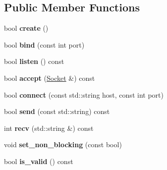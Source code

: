\subsection*{Public Member Functions}
\begin{DoxyCompactItemize}
\item 
\hypertarget{classSocket_a6afde2dca985dacdfa770141192e2daf}{bool {\bfseries create} ()}\label{classSocket_a6afde2dca985dacdfa770141192e2daf}

\item 
\hypertarget{classSocket_abfc7244009defd5c5e1ad173142a5059}{bool {\bfseries bind} (const int port)}\label{classSocket_abfc7244009defd5c5e1ad173142a5059}

\item 
\hypertarget{classSocket_a0988791cca0cc0eeee0c854500d7f527}{bool {\bfseries listen} () const }\label{classSocket_a0988791cca0cc0eeee0c854500d7f527}

\item 
\hypertarget{classSocket_a068f789510d289f59a1fc1f51fbb9ed3}{bool {\bfseries accept} (\hyperlink{classSocket}{Socket} \&) const }\label{classSocket_a068f789510d289f59a1fc1f51fbb9ed3}

\item 
\hypertarget{classSocket_afe535648cf44461c6ded1b2d72056d47}{bool {\bfseries connect} (const std\-::string host, const int port)}\label{classSocket_afe535648cf44461c6ded1b2d72056d47}

\item 
\hypertarget{classSocket_a011c857282aadbfde92558985e0191cd}{bool {\bfseries send} (const std\-::string) const }\label{classSocket_a011c857282aadbfde92558985e0191cd}

\item 
\hypertarget{classSocket_af6cbe662cffa8f593f9c0e42440180f3}{int {\bfseries recv} (std\-::string \&) const }\label{classSocket_af6cbe662cffa8f593f9c0e42440180f3}

\item 
\hypertarget{classSocket_ac4d1d5bc09e469b72f52fbcf758a5cf0}{void {\bfseries set\-\_\-non\-\_\-blocking} (const bool)}\label{classSocket_ac4d1d5bc09e469b72f52fbcf758a5cf0}

\item 
\hypertarget{classSocket_a157f83a7404aec259c58783cd9af6ea6}{bool {\bfseries is\-\_\-valid} () const }\label{classSocket_a157f83a7404aec259c58783cd9af6ea6}

\end{DoxyCompactItemize}


